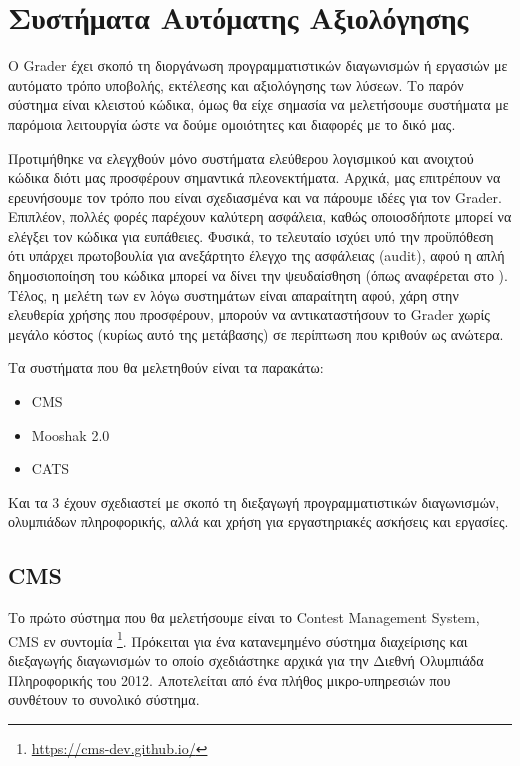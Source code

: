 \documentclass[diploma]{softlab-thesis}
\begin{document}
\chapter{Συστήματα Αυτόματης Αξιολόγησης}

O Grader έχει σκοπό τη διοργάνωση προγραμματιστικών διαγωνισμών ή εργασιών
με αυτόματο τρόπο υποβολής, εκτέλεσης και αξιολόγησης των λύσεων. Το παρόν
σύστημα είναι κλειστού κώδικα, όμως θα είχε σημασία να μελετήσουμε συστήματα
με παρόμοια λειτουργία ώστε να δούμε ομοιότητες και διαφορές με το δικό μας.

\bigskip

Προτιμήθηκε να ελεγχθούν μόνο συστήματα ελεύθερου λογισμικού και ανοιχτού
κώδικα διότι μας προσφέρουν σημαντικά πλεονεκτήματα. Αρχικά, μας επιτρέπουν να
ερευνήσουμε τον τρόπο που είναι σχεδιασμένα και να πάρουμε ιδέες για τον
Grader. Επιπλέον, πολλές φορές παρέχουν καλύτερη ασφάλεια, καθώς οποιοσδήποτε
μπορεί να ελέγξει τον κώδικα για ευπάθειες. Φυσικά, το τελευταίο ισχύει υπό την
προϋπόθεση ότι υπάρχει πρωτοβουλία για ανεξάρτητο έλεγχο της ασφάλειας (audit),
αφού η απλή δημοσιοποίηση του κώδικα μπορεί να δίνει την ψευδαίσθηση (όπως
αναφέρεται στο \cite{hansen2002open}). Τέλος, η μελέτη των εν λόγω συστημάτων
είναι απαραίτητη αφού, χάρη στην ελευθερία χρήσης που προσφέρουν, μπορούν να
αντικαταστήσουν το Grader χωρίς μεγάλο κόστος (κυρίως αυτό της μετάβασης) σε
περίπτωση που κριθούν ως ανώτερα.

\bigskip

Τα συστήματα που θα μελετηθούν είναι τα παρακάτω:

\begin{itemize}
    \setlength\itemsep{0em}
    \item CMS
    \item Mooshak 2.0
    \item CATS
\end{itemize}

Και τα 3 έχουν σχεδιαστεί με σκοπό τη διεξαγωγή προγραμματιστικών διαγωνισμών,
ολυμπιάδων πληροφορικής, αλλά και χρήση για εργαστηριακές ασκήσεις και
εργασίες.

\section{CMS}

Το πρώτο σύστημα που θα μελετήσουμε είναι το Contest Management System, CMS εν
συντομία \footnote{\url{https://cms-dev.github.io/}}. Πρόκειται για ένα κατανεμημένο σύστημα διαχείρισης και διεξαγωγής
διαγωνισμών το οποίο σχεδιάστηκε αρχικά για την Διεθνή Ολυμπιάδα Πληροφορικής
του 2012. Αποτελείται από ένα πλήθος μικρο-υπηρεσιών που συνθέτουν το συνολικό
σύστημα.
\end{document}
